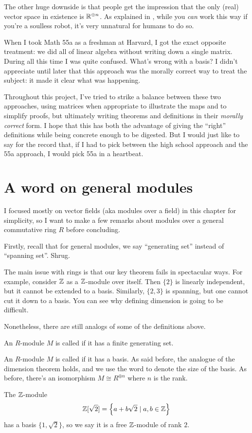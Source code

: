The other huge downside is that people get the impression
that the only (real) vector space in existence is $\mathbb R^{\oplus n}$.
As explained in ,
while you \emph{can} work this way if you're a soulless robot,
it's very unnatural for humans to do so.

When I took Math 55a as a freshman at Harvard,
I got the exact opposite treatment:
we did all of linear algebra without writing down a single matrix.
During all this time I was quite confused.
What's wrong with a basis?
I didn't appreciate until later that this approach was the
morally correct way to treat the subject: it made it clear what was happening.

Throughout this project, I've tried to strike a balance between these
two approaches, using matrices when appropriate to illustrate
the maps and to simplify proofs, but ultimately writing
theorems and definitions in their \emph{morally correct} form.
I hope that this has both the advantage of giving the ``right'' definitions
while being concrete enough to be digested.
But I would just like to say for the record that,
if I had to pick between the high school approach and the 55a approach,
I would pick 55a in a heartbeat.

\section{A word on general modules}
I focused mostly on vector fields (aka modules over a field) in this chapter
for simplicity, so I want to make a few remarks about
modules over a general commutative ring $R$ before concluding.

Firstly, recall that for general modules,
we say ``generating set'' instead of ``spanning set''.
Shrug.

The main issue with rings is that our key theorem 
fails in spectacular ways.
For example, consider $\mathbb Z$ as a $\mathbb Z$-module over itself.
Then $\{2\}$ is linearly independent, but it cannot be extended to a basis.
Similarly, $\{2,3\}$ is spanning, but one cannot cut it down to a basis.
You can see why defining dimension is going to be difficult.

Nonetheless, there are still analogs of some of the definitions above.
\begin{definition}
	An $R$-module $M$ is called  if it has a finite generating set.
\end{definition}
\begin{definition}
	An $R$-module $M$ is called  if it has a basis.
	As said before, the analogue of the dimension theorem holds,
	and we use the word  to denote the size of the basis.
	As before, there's an isomorphism $M \cong R^{\oplus n}$ where $n$ is the rank.
\end{definition}
\begin{example}
	The $\mathbb Z$-module
	\[ \mathbb Z[\sqrt2] = \left\{ a + b\sqrt 2 \mid a,b \in \mathbb Z \right\} \]
	has a basis $\{1, \sqrt 2\}$, so we say it is
	a free $\mathbb Z$-module of rank $2$.
\end{example}

